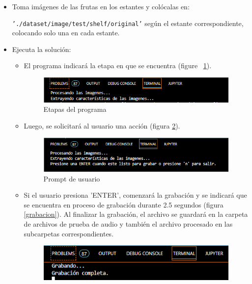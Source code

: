 \documentclass[a4paper, 12pt]{article}
\begin{document}
\begin{itemize}
    \item Toma imágenes de las frutas en los estantes y colócalas en:
    
    \texttt{'./dataset/image/test/shelf/original'} según el estante correspondiente, colocando solo una en cada estante.
    \item Ejecuta la solución:
    \begin{itemize}
        \item El programa indicará la etapa en que se encuentra (figure ~\ref{solucion_etapas}).
        \begin{figure}[!htbp]
            \centering
            \includegraphics[width=\linewidth]{SOLUCION_ETAPAS.PNG}
            \caption{Etapas del programa}
            \label{solucion_etapas}
        \end{figure}
        \item Luego, se solicitará al usuario una acción (figura \ref{solucion_prompt}).
        \begin{figure}[!htbp]
            \centering
            \includegraphics[width=\linewidth]{SOLUCION_PROMPT.PNG}
            \caption{Prompt de usuario}
            \label{solucion_prompt}
        \end{figure}
        \item Si el usuario presiona 'ENTER', comenzará la grabación y se indicará que se encuentra en proceso de grabación durante 2.5 segundos (figura \ref{grabacion}). Al finalizar la grabación, el archivo se guardará en la carpeta de archivos de prueba de audio y también el archivo procesado en las subcarpetas correspondientes.
        \begin{figure}[!htbp]
            \centering
            \includegraphics[width=0.8\linewidth]{GRABACION.PNG}

\end{figure}
\end{itemize}
\end{itemize}
\end{document}

